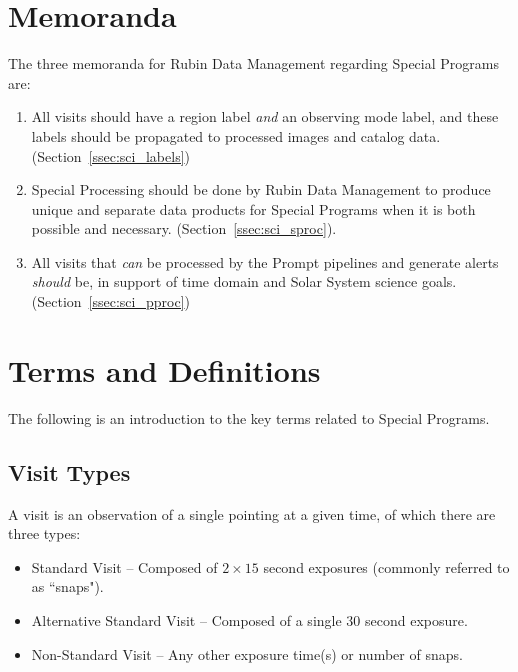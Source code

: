 \section{Memoranda} \label{sec:mem}

The three memoranda for Rubin Data Management regarding Special Programs are:

\begin{enumerate}

\item All visits should have a region label \textit{and} an observing mode
label, and these labels should be propagated to processed images and catalog data.
(Section~\ref{ssec:sci_labels})

\item Special Processing should be done by Rubin Data Management to 
produce unique and separate data products
for Special Programs when it is both possible and necessary.
(Section~\ref{ssec:sci_sproc}).

\item All visits that \emph{can} be processed by the Prompt pipelines and generate 
alerts \emph{should} be, in support of time domain and Solar System science goals.
(Section~\ref{ssec:sci_pproc})

\end{enumerate}

\section{Terms and Definitions}\label{sec:intro}

The following is an introduction to the key terms related to Special Programs.

\subsection{Visit Types}

A visit is an observation of a single pointing at a given time, of which 
there are three types:

\begin{itemize}
\item Standard Visit -- Composed of $2\times15$ second exposures (commonly referred to as ``snaps").
\item Alternative Standard Visit -- Composed of a single $30$ second exposure.
\item Non-Standard Visit -- Any other exposure time(s) or number of snaps.
\end{itemize}


